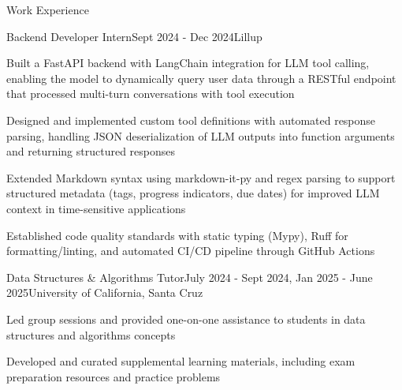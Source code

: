 \documentclass{resume}
\begin{document}
\begin{rSection}{Work Experience}

  \begin{rSubsection}{Backend Developer Intern}{Sept 2024 - Dec 2024}{Lillup}{}
  \item{} Built a FastAPI backend with LangChain integration for LLM
    tool calling, enabling the model to dynamically query user data
    through a RESTful endpoint that processed multi-turn
    conversations with tool execution
  \item{} Designed and implemented custom tool definitions with
    automated response parsing, handling JSON deserialization of LLM
    outputs into function arguments and returning structured responses
  \item{} Extended Markdown syntax using markdown-it-py and regex parsing
    to support structured metadata (tags, progress indicators, due
    dates) for improved LLM context in time-sensitive applications
  \item{} Established code quality standards with static typing (Mypy),
    Ruff for formatting/linting, and automated CI/CD pipeline through
    GitHub Actions
  \end{rSubsection}

  \begin{rSubsection}{Data Structures \& Algorithms Tutor}{July 2024
    - Sept 2024, Jan 2025 - June 2025}{University of California, Santa Cruz}{}
  \item{} Led group sessions and provided one-on-one assistance to
    students in data structures and algorithms concepts
  \item{} Developed and curated supplemental learning materials,
    including exam preparation resources and practice problems
  \end{rSubsection}

\end{rSection}
\end{document}
